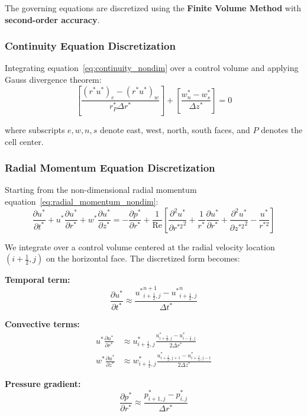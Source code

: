 \documentclass[12pt,a4paper]{article}
\newcommand{\parder}[2]{\frac{\partial #1}{\partial #2}}
\newcommand{\pparder}[2]{\frac{\partial^2 #1}{\partial {#2}^2}}
\newcommand{\Rey}{\text{Re}}
\begin{document}
The governing equations are discretized using the \textbf{Finite Volume Method} with \textbf{second-order accuracy}.

\subsubsection{Continuity Equation Discretization}

Integrating equation~\eqref{eq:continuity_nondim} over a control volume and applying Gauss divergence theorem:
\begin{equation}
    \left[\frac{(r^*u^*)_e - (r^*u^*)_w}{r^*_P\Delta r^*}\right] + \left[\frac{w^*_n - w^*_s}{\Delta z^*}\right] = 0
\end{equation}

where subscripts $e, w, n, s$ denote east, west, north, south faces, and $P$ denotes the cell center.

\subsubsection{Radial Momentum Equation Discretization}

Starting from the non-dimensional radial momentum equation~\eqref{eq:radial_momentum_nondim}:
\begin{equation}
    \parder{u^*}{t^*} + u^*\parder{u^*}{r^*} + w^*\parder{u^*}{z^*} = -\parder{p^*}{r^*} + \frac{1}{\Rey}\left[\pparder{u^*}{r^{*2}} + \frac{1}{r^*}\parder{u^*}{r^*} + \pparder{u^*}{z^{*2}} - \frac{u^*}{r^{*2}}\right]
\end{equation}

We integrate over a control volume centered at the radial velocity location $(i+\frac{1}{2}, j)$ on the horizontal face. The discretized form becomes:

\textbf{Temporal term:}
\begin{equation}
    \parder{u^*}{t^*} \approx \frac{{u^*}_{i+\frac{1}{2},j}^{n+1} - {u^*}_{i+\frac{1}{2},j}^{n}}{\Delta t^*}
\end{equation}

\textbf{Convective terms:}
\begin{align}
    u^*\parder{u^*}{r^*} &\approx u^*_{i+\frac{1}{2},j}\frac{u^*_{i+\frac{3}{2},j} - u^*_{i-\frac{1}{2},j}}{2\Delta r^*} \\
    w^*\parder{u^*}{z^*} &\approx w^*_{i+\frac{1}{2},j}\frac{u^*_{i+\frac{1}{2},j+1} - u^*_{i+\frac{1}{2},j-1}}{2\Delta z^*}
\end{align}

\textbf{Pressure gradient:}
\begin{equation}
    \parder{p^*}{r^*} \approx \frac{p^*_{i+1,j} - p^*_{i,j}}{\Delta r^*}
\end{equation}
\end{document}
